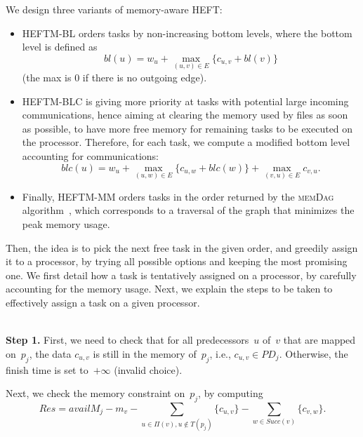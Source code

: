 \documentclass[conference]{IEEEtran}
\newcommand{\algo}[1]{\textsc{#1}}
\newcommand{\skug}[1]{{\color{blue}[SK: #1]}}
\begin{document}
We design three variants of memory-aware HEFT:
\begin{itemize}
\item    HEFTM-BL orders tasks by non-increasing bottom levels, where the bottom
    level is defined as
    $$bl(u) = w_u + \max_{(u,v)\in E} \{c_{u,v} + bl(v)\}$$
    (the max is 0 if there is no outgoing edge).

\item    HEFTM-BLC %
    is  giving more priority at tasks with potential large incoming communications,
    hence aiming at clearing the memory used by files as soon as possible,
    to have more free memory for remaining tasks to be executed on the processor.
    Therefore, for each task, we compute a modified bottom level accounting for communications:
    $$blc(u) = w_u + \max_{(u,w)\in E} \{c_{u,w} + blc(w)\} + \max_{(v,u)\in E} c_{v,u}   . $$


\item   Finally, HEFTM-MM orders tasks  in the order returned by %
the  \algo{memDag} algorithm~\cite{KAYAASLAN20181}, which corresponds to a traversal
of the graph that minimizes the peak memory usage.

\end{itemize}

\smallskip

    Then, the idea is to pick the next free task in the given order,
    and greedily assign it to a processor, by trying all possible options
    and keeping the most promising one. We first detail how a task
    is tentatively assigned on a processor, by carefully accounting for the memory usage.
    Next, we explain the steps to be taken to effectively assign a task on a given processor.

    \medskip
    \\
    {\bf Step 1.} First, we need to check that for all predecessors~$u$ of~$v$ that are mapped
    on~$p_j$, the data $c_{u,v}$ is still in the memory of~$p_j$,
    i.e., $c_{u,v}\in PD_j$. Otherwise, the finish time is set to~$+\infty$ (invalid choice).

    \smallskip
     Next, we check the memory constraint on~$p_j$, by computing
    \[Res = availM_j - m_v - \sum_{u \in \Pi(v), u\notin T(p_j)}  \{c_{u,v}\}
    - \sum_{w\in Succ(v)}  \{c_{v,w}\}.\]
\end{document}
